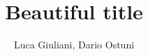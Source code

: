 \documentclass[11pt,a4paper]{report}
\begin{document}
\title{Beautiful title}
\author{Luca Giuliani, Dario Ostuni}
\date{}
\maketitle

\tableofcontents





\end{document}

